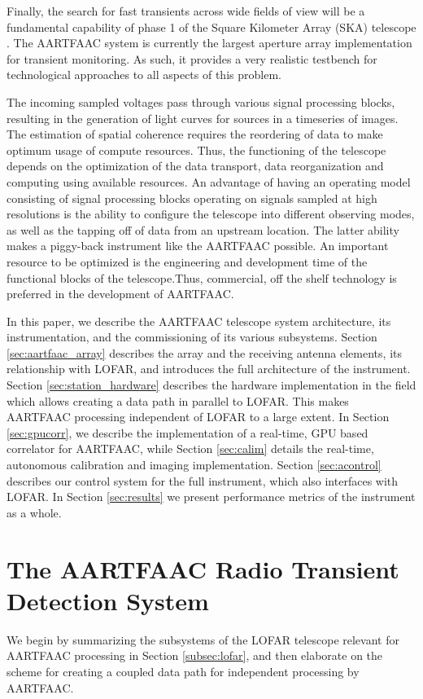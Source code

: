 \documentclass{ws-jai}
\begin{document}
Finally, the  search for fast  transients across wide fields  of view will  be a
fundamental capability of phase 1 of  the Square Kilometer Array (SKA) telescope
\cite{colegate2011searching}.  The  AARTFAAC  system  is  currently  the  largest
aperture array implementation  for transient monitoring. As such,  it provides a
very realistic  testbench for  technological approaches to  all aspects  of this
problem.

The incoming  sampled voltages  pass through  various signal  processing blocks,
resulting  in the  generation of  light curves  for sources  in a  timeseries of
images.  The estimation of spatial coherence  requires the reordering of data to
make optimum usage of compute resources.  Thus, the functioning of the telescope
depends  on the  optimization of  the  data transport,  data reorganization  and
computing using available resources.  An  advantage of having an operating model
consisting  of signal  processing blocks  operating on  signals sampled  at high
resolutions is the  ability to configure the telescope  into different observing
modes, as well as the tapping off of data from an upstream location.  The latter
ability makes a piggy-back instrument  like the AARTFAAC possible.  An important
resource  to  be optimized  is  the  engineering  and  development time  of  the
functional blocks of the telescope.Thus, commercial, off the shelf technology is
preferred in the development of AARTFAAC.

In  this paper,  we describe  the  AARTFAAC telescope  system architecture,  its
instrumentation,  and  the commissioning  of  its  various subsystems.   Section
\ref{sec:aartfaac_array} describes the array and the receiving antenna elements,
its  relationship  with LOFAR,  and  introduces  the  full architecture  of  the
instrument.    Section   \ref{sec:station_hardware}   describes   the   hardware
implementation in  the field which  allows creating a  data path in  parallel to
LOFAR. This  makes AARTFAAC processing independent  of LOFAR to a  large extent.
In Section \ref{sec:gpucorr}, we describe the implementation of a real-time, GPU
based  correlator  for  AARTFAAC,  while  Section  \ref{sec:calim}  details  the
real-time,   autonomous  calibration   and   imaging  implementation.    Section
\ref{sec:acontrol} describes our  control system for the  full instrument, which
also interfaces with LOFAR.  In Section \ref{sec:results} we present performance
metrics of the instrument as a whole.

\section {\label{sec:aartfaac_array}The AARTFAAC Radio Transient Detection System}
We  begin by  summarizing the  subsystems of  the LOFAR  telescope relevant  for
AARTFAAC processing  in Section  \ref{subsec:lofar}, and  then elaborate  on the
scheme for creating a coupled data path for independent processing by AARTFAAC.
\end{document}
